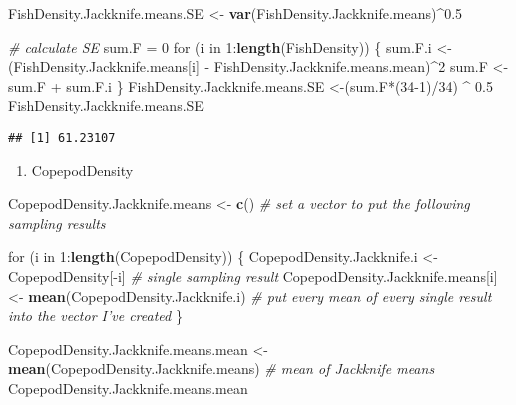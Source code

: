 \documentclass[]{article}
\newenvironment{Shaded}{\begin{snugshade}}{\end{snugshade}}
\newcommand{\KeywordTok}[1]{\textcolor[rgb]{0.13,0.29,0.53}{\textbf{{#1}}}}
\newcommand{\DecValTok}[1]{\textcolor[rgb]{0.00,0.00,0.81}{{#1}}}
\newcommand{\FloatTok}[1]{\textcolor[rgb]{0.00,0.00,0.81}{{#1}}}
\newcommand{\StringTok}[1]{\textcolor[rgb]{0.31,0.60,0.02}{{#1}}}
\newcommand{\CommentTok}[1]{\textcolor[rgb]{0.56,0.35,0.01}{\textit{{#1}}}}
\newcommand{\NormalTok}[1]{{#1}}
\providecommand{\tightlist}{%
  \setlength{\itemsep}{0pt}\setlength{\parskip}{0pt}}
\begin{document}
\begin{Shaded}
\begin{Highlighting}[]
\NormalTok{FishDensity.Jackknife.means.SE <-}\StringTok{ }\KeywordTok{var}\NormalTok{(FishDensity.Jackknife.means)^}\FloatTok{0.5}

\CommentTok{# calculate SE}
\NormalTok{sum.F =}\StringTok{ }\DecValTok{0}
\NormalTok{for (i in }\DecValTok{1}\NormalTok{:}\KeywordTok{length}\NormalTok{(FishDensity)) \{}
  \NormalTok{sum.F.i <-}\StringTok{ }\NormalTok{(FishDensity.Jackknife.means[i] -}\StringTok{ }\NormalTok{FishDensity.Jackknife.means.mean)^}\DecValTok{2}
  \NormalTok{sum.F <-}\StringTok{ }\NormalTok{sum.F +}\StringTok{ }\NormalTok{sum.F.i}
\NormalTok{\}}
\NormalTok{FishDensity.Jackknife.means.SE <-(sum.F*(}\DecValTok{34-1}\NormalTok{)/}\DecValTok{34}\NormalTok{) ^}\StringTok{ }\FloatTok{0.5}
\NormalTok{FishDensity.Jackknife.means.SE}
\end{Highlighting}
\end{Shaded}

\begin{verbatim}
## [1] 61.23107
\end{verbatim}

\begin{enumerate}
\def\labelenumi{(\arabic{enumi})}
\setcounter{enumi}{1}
\tightlist
\item
  CopepodDensity
\end{enumerate}

\begin{Shaded}
\begin{Highlighting}[]
\NormalTok{CopepodDensity.Jackknife.means <-}\StringTok{ }\KeywordTok{c}\NormalTok{() }\CommentTok{# set a vector to put the following sampling results}

\NormalTok{for (i in }\DecValTok{1}\NormalTok{:}\KeywordTok{length}\NormalTok{(CopepodDensity)) \{}
\NormalTok{CopepodDensity.Jackknife.i <-}\StringTok{ }\NormalTok{CopepodDensity[-i] }\CommentTok{# single sampling result}
\NormalTok{CopepodDensity.Jackknife.means[i] <-}\StringTok{ }\KeywordTok{mean}\NormalTok{(CopepodDensity.Jackknife.i) }\CommentTok{# put every mean of every single result into the vector I've created}
\NormalTok{\}}

\NormalTok{CopepodDensity.Jackknife.means.mean <-}\StringTok{ }\KeywordTok{mean}\NormalTok{(CopepodDensity.Jackknife.means) }\CommentTok{# mean of Jackknife means}
\NormalTok{CopepodDensity.Jackknife.means.mean}
\end{Highlighting}
\end{Shaded}
\end{document}
